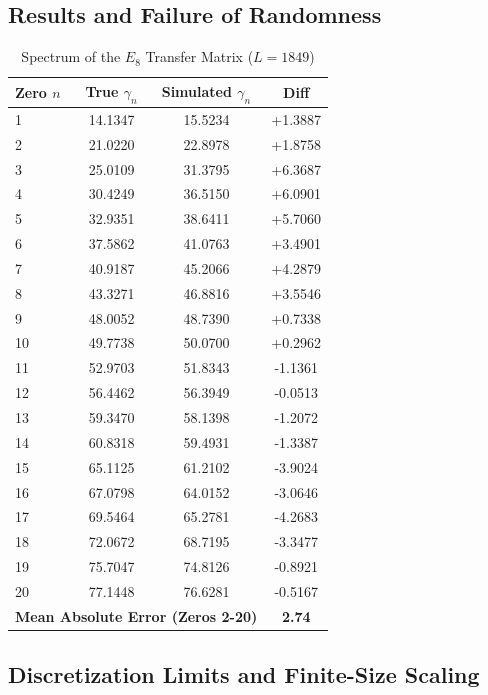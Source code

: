 \documentclass[11pt,aps,prd,twocolumn,nofootinbib,superscriptaddress]{revtex4-2}
\begin{document}
\subsection{Results and Failure of Randomness}

\begin{table}[h]
\centering
\caption{Spectrum of the $E_8$ Transfer Matrix ($L=1849$)}
\begin{tabular}{@{}lccc@{}}
\toprule
\textbf{Zero $n$} & \textbf{True $\gamma_n$} & \textbf{Simulated $\gamma_n$} & \textbf{Diff} \\
\midrule
1 & 14.1347 & 15.5234 & +1.3887 \\
2 & 21.0220 & 22.8978 & +1.8758 \\
3 & 25.0109 & 31.3795 & +6.3687 \\
4 & 30.4249 & 36.5150 & +6.0901 \\
5 & 32.9351 & 38.6411 & +5.7060 \\
6 & 37.5862 & 41.0763 & +3.4901 \\
7 & 40.9187 & 45.2066 & +4.2879 \\
8 & 43.3271 & 46.8816 & +3.5546 \\
9 & 48.0052 & 48.7390 & +0.7338 \\
10 & 49.7738 & 50.0700 & +0.2962 \\
11 & 52.9703 & 51.8343 & -1.1361 \\
12 & 56.4462 & 56.3949 & -0.0513 \\
13 & 59.3470 & 58.1398 & -1.2072 \\
14 & 60.8318 & 59.4931 & -1.3387 \\
15 & 65.1125 & 61.2102 & -3.9024 \\
16 & 67.0798 & 64.0152 & -3.0646 \\
17 & 69.5464 & 65.2781 & -4.2683 \\
18 & 72.0672 & 68.7195 & -3.3477 \\
19 & 75.7047 & 74.8126 & -0.8921 \\
20 & 77.1448 & 76.6281 & -0.5167 \\
\midrule
\multicolumn{3}{l}{\textbf{Mean Absolute Error (Zeros 2-20)}} & \textbf{2.74} \\
\bottomrule
\end{tabular}
\label{tab:spectrum}
\end{table}

\subsection{Discretization Limits and Finite-Size Scaling}
\end{document}
